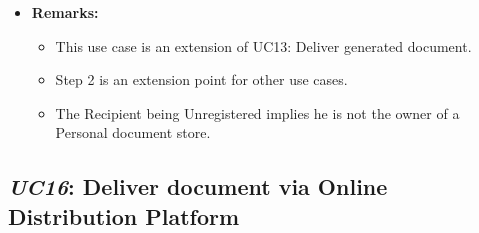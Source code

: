 \documentclass[a4paper,10pt]{article}
\begin{document}
\begin{itemize}
    \item \textbf{Remarks:}
        \begin{itemize}
            \item This use case is an extension of UC13: Deliver generated document.
            \item Step 2 is an extension point for other use cases.
            \item The Recipient being Unregistered implies he is not the owner of a Personal document store.
        \end{itemize}
\end{itemize}

\subsection{\emph{UC16}: Deliver document via Online Distribution Platform}
\end{document}
